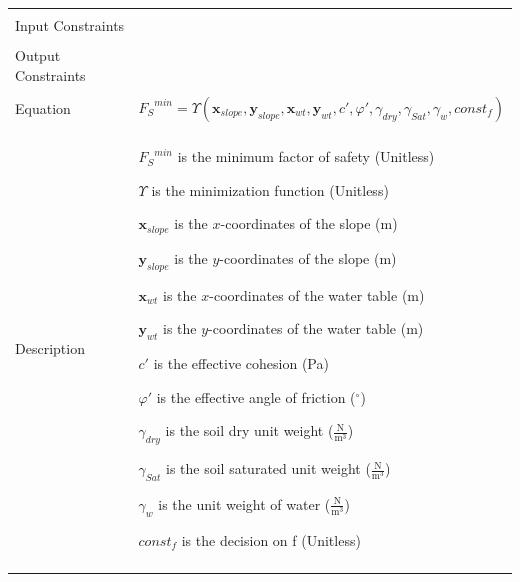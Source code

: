 \documentclass[12pt]{article}
\begin{document}
\begin{minipage}{\textwidth}
\begin{tabular}{>{\raggedright}p{}>{\raggedright\arraybackslash}p{}}
\\ \midrule \\
Input Constraints & 
\\ \midrule \\
Output Constraints & 
\\ \midrule \\
Equation & \begin{displaymath}
           {{F_{S}}^{min}}=Υ\left({\mathbf{x}_{slope}},{\mathbf{y}_{slope}},{\mathbf{x}_{wt}},{\mathbf{y}_{wt}},c',φ',{γ_{dry}},{γ_{Sat}},{γ_{w}},const_f\right)
           \end{displaymath}
\\ \midrule \\
Description & \begin{symbDescription}
              \item{${{F_{S}}^{min}}$ is the minimum factor of safety (Unitless)}
              \item{$Υ$ is the minimization function (Unitless)}
              \item{${\mathbf{x}_{slope}}$ is the $x$-coordinates of the slope (m)}
              \item{${\mathbf{y}_{slope}}$ is the $y$-coordinates of the slope (m)}
              \item{${\mathbf{x}_{wt}}$ is the $x$-coordinates of the water table (m)}
              \item{${\mathbf{y}_{wt}}$ is the $y$-coordinates of the water table (m)}
              \item{$c'$ is the effective cohesion (Pa)}
              \item{$φ'$ is the effective angle of friction (${}^{\circ}$)}
              \item{${γ_{dry}}$ is the soil dry unit weight ($\frac{\text{N}}{\text{m}^{3}}$)}
              \item{${γ_{Sat}}$ is the soil saturated unit weight ($\frac{\text{N}}{\text{m}^{3}}$)}
              \item{${γ_{w}}$ is the unit weight of water ($\frac{\text{N}}{\text{m}^{3}}$)}
              \item{$const_f$ is the decision on f (Unitless)}
              \end{symbDescription}
\\ \midrule \\

\end{tabular}
\end{minipage}
\end{document}
